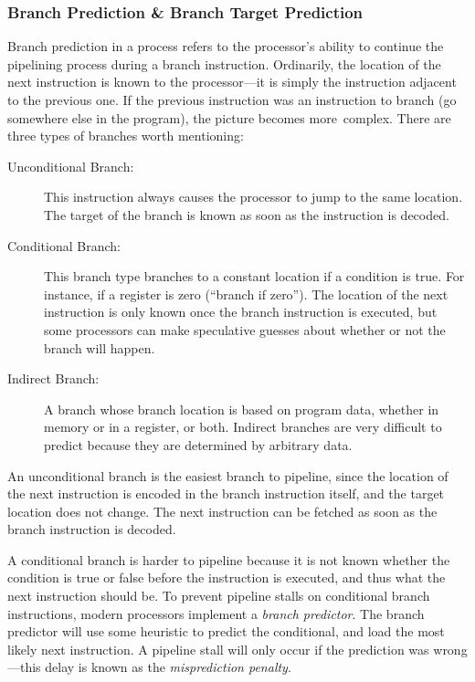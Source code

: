 			\subsubsection{Branch Prediction \& Branch Target Prediction}
			Branch prediction in a process refers to the processor's ability to continue the pipelining process during a branch instruction. Ordinarily, the location of the next instruction is known to the processor---it is simply the instruction adjacent to the previous one. If the previous instruction was an instruction to branch (go somewhere else in the program), the picture becomes more~complex. There are three types of branches worth mentioning:
			\par\nobreak\makeatletter\@afterheading\makeatother
			\begin{description}
				\item[Unconditional Branch:] This instruction always causes the processor to jump to the same location. The target of the branch is known as soon as the instruction is decoded.
				\item[Conditional Branch:] This branch type branches to a constant location if a condition is true. For instance, if a register is zero (``branch if zero''). The location of the next instruction is only known once the branch instruction is executed, but some processors can make speculative guesses about whether or not the branch will happen.
				\item[Indirect Branch:] A branch whose branch location is based on program data, whether in memory or in a register, or both. Indirect branches are very difficult to predict because they are determined by arbitrary data.
			\end{description}
			
			An unconditional branch is the easiest branch to pipeline, since the location of the next instruction is encoded in the branch instruction itself, and the target location does not change. The next instruction can be fetched as soon as the branch instruction is decoded. 
			
			A conditional branch is harder to pipeline because it is not known whether the condition is true or false before the instruction is executed, and thus what the next instruction should be. To prevent pipeline stalls on conditional branch instructions, modern processors implement a \emph{branch predictor}. The branch predictor will use some heuristic to predict the conditional, and load the most likely next instruction. A pipeline stall will only occur if the prediction was wrong---this delay is known as the \emph{misprediction penalty}.
			
